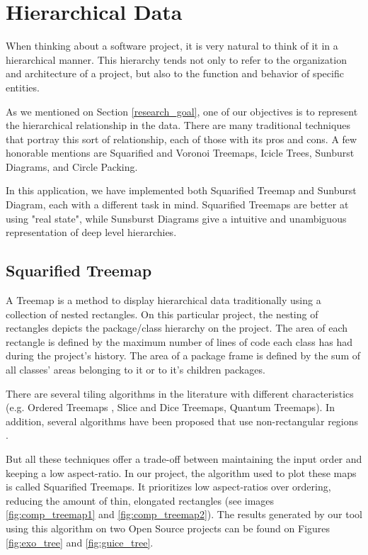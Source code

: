 \section{Hierarchical Data} \label{sec:hierarchy}
When thinking about a software project, it is very natural to think of it in a hierarchical manner. This hierarchy tends not only to refer to the organization and architecture of a project, but also to the function and behavior of specific entities.

As we mentioned on Section \ref{research_goal}, one of our objectives is to represent the hierarchical relationship in the data. There are many traditional techniques that portray this sort of relationship, each of those with its pros and cons. A few honorable mentions are Squarified \cite{ref:squarified} and Voronoi \cite{ref:tree2} Treemaps, Icicle Trees, Sunburst Diagrams, and Circle Packing.

In this application, we have implemented both Squarified Treemap and Sunburst Diagram, each with a different task in mind. Squarified Treemaps are better at using "real state", while Sunsburst Diagrams give a intuitive and unambiguous representation of deep level hierarchies.

\subsection{Squarified Treemap}
A Treemap is a method to display hierarchical data traditionally using a collection of nested rectangles. On this particular project, the nesting of rectangles depicts the package/class hierarchy on the project. The area of each rectangle is defined by the maximum number of lines of code each class has had during the project's history. The area of a package frame is defined by the sum of all classes' areas belonging to it or to it's children packages.

There are several tiling algorithms in the literature with different characteristics (e.g. Ordered Treemaps \cite{ref:orderedtreemap}, Slice and Dice Treemaps\cite{ref:orderedtreemap}, Quantum Treemaps\cite{ref:quantumtreemap}). In addition, several algorithms have been proposed that use non-rectangular regions  \cite{ref:tree1,ref:tree2,ref:tree3}.

But all these techniques offer a trade-off between maintaining the input order and keeping a low aspect-ratio. In our project, the algorithm used to plot these maps is called Squarified Treemaps\cite{ref:squarified}. It prioritizes low aspect-ratios over ordering, reducing the amount of thin, elongated rectangles (see images \ref{fig:comp_treemap1} and \ref{fig:comp_treemap2}). The results generated by our tool using this algorithm on two Open Source projects can be found on Figures \ref{fig:exo_tree} and \ref{fig:guice_tree}.

